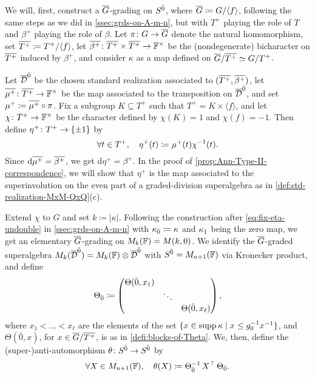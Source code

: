 We will, first, construct a $\barr G$-grading on $S^{\bar0}$, where $\barr G \coloneqq G/\langle f \rangle$, following the same steps as we did in \cref{ssec:grds-on-A-m-n}, but with $T^+$ playing the role of $T$ and $\beta^+$ playing the role of $\beta$. 
Let $\pi\from G \to \barr G$ denote the natural homomorphism, set $\barr {T^+} \coloneqq T^+/\langle f \rangle$, let $\barr {\beta^+}\from \barr {T^+} \times \barr {T^+} \to \FF^\times$ be the (nondegenerate) bicharacter on $\barr {T^+}$ induced by $\beta^+$, and consider $\kappa$ as a map defined on $\barr G/\barr {T^+} \iso G/{T^+}$.

Let $\barr \D\even$ be the chosen standard realization associated to $(\barr{T^+}, \barr{\beta^+})$, let $\barr {\mu^+}\from \barr{T^+} \to \FF^\times$ be the map associated to the transposition on $\barr \D\even$, and set $\mu^+ \coloneqq \barr {\mu^+} \circ \pi$. 
Fix a subgroup $K \subseteq T^+$ such that $T^+ = K \times \langle f \rangle$, and let $\chi\colon T^+ \to \mathbb{F}^\times$ be the character defined by $\chi(K) = 1$ and $\chi(f) = -1$. 
Then define $\eta^+\colon T^+ \to \{ \pm 1 \}$ by
\[\label{eq:fix-eta-plus-undouble-Ann}
    \forall t\in T^+, \quad \eta^+(t) \coloneqq \mu^+(t) \chi^{-1}(t).
\] 
Since $\mathrm{d} \barr{\mu^+} = \barr{\beta^+}$, we get $\mathrm{d} \eta^+ = \beta^+$. 
In the proof of \cref{prop:Ann-Type-II-correspondence}, we will show that $\eta^+$ is the map associated to the superinvolution on the even part of a graded-division superalgebra as in \cref{def:std-realization-MxM-QxQ}(c). 

Extend $\chi$ to $G$ and set $k \coloneqq |\kappa|$. 
Following the construction after \cref{eq:fix-eta-undouble} in \cref{ssec:grds-on-A-m-n} with $\kappa_{\bar{0}} \coloneqq \kappa$ and $\kappa_{\bar{1}}$ being the zero map, we get an elementary $\barr G$-grading on $M_k(\mathbb{F}) = M(k , 0)$. 
We identify the $\barr G$-graded superalgebra $M_{k}(\barr \D\even) = M_{k}(\FF) \tensor \barr\D\even$ with $S^{\bar0} = M_{n+1}(\mathbb{F})$ via Kronecker product, and define 
\[\label{eq:Theta_bz-for-Ann}
    \Theta_{\bar{0}} \coloneqq \begin{pmatrix}
        \Theta(\bar 0, x_1)&& \\
        & \ddots &\\
        && \Theta(\bar 0, x_{\ell})
    \end{pmatrix},
\]
where $x_1 < \ldots < x_{\ell}$ are the elements of the set $\{ x \in \operatorname{supp} \kappa \mid x \leq g_0^{-1} x^{-1} \}$, and $\Theta(\bar 0, x)$, for $x\in \barr G/\barr {T^+}$, is as in \cref{defi:blocks-of-Theta}. 
We, then, define the (super-)anti-automorphism $\theta\colon S^{\bar0} \to S^{\bar0}$ by 
\[\label{eq:theta-with-matrix-4}
    \forall X\in M_{n+1}(\mathbb{F}), \quad \theta(X) \coloneqq \Theta_{\bar{0}}^{-1}\, X^{\top}\, \Theta_{\bar{0}}.
\]

